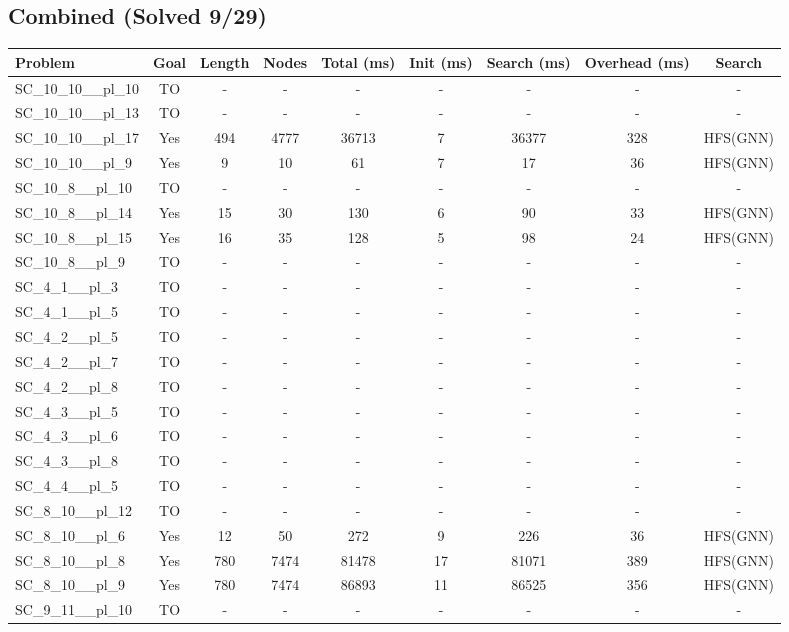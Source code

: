 \documentclass{article}
\begin{document}
\subsection*{Combined (Solved 9/29)}
\begin{tabular}{lcccccccc}
\toprule
Problem & Goal & Length & Nodes & Total (ms) & Init (ms) & Search (ms) & Overhead (ms) & Search \\
\midrule
SC\_10\_10\_\_pl\_10 & TO & - & - & - & - & - & - & - \\
SC\_10\_10\_\_pl\_13 & TO & - & - & - & - & - & - & - \\
SC\_10\_10\_\_pl\_17 & Yes & 494 & 4777 & 36713 & 7 & 36377 & 328 & HFS(GNN) \\
SC\_10\_10\_\_pl\_9 & Yes & 9 & 10 & 61 & 7 & 17 & 36 & HFS(GNN) \\
SC\_10\_8\_\_pl\_10 & TO & - & - & - & - & - & - & - \\
SC\_10\_8\_\_pl\_14 & Yes & 15 & 30 & 130 & 6 & 90 & 33 & HFS(GNN) \\
SC\_10\_8\_\_pl\_15 & Yes & 16 & 35 & 128 & 5 & 98 & 24 & HFS(GNN) \\
SC\_10\_8\_\_pl\_9 & TO & - & - & - & - & - & - & - \\
SC\_4\_1\_\_pl\_3 & TO & - & - & - & - & - & - & - \\
SC\_4\_1\_\_pl\_5 & TO & - & - & - & - & - & - & - \\
SC\_4\_2\_\_pl\_5 & TO & - & - & - & - & - & - & - \\
SC\_4\_2\_\_pl\_7 & TO & - & - & - & - & - & - & - \\
SC\_4\_2\_\_pl\_8 & TO & - & - & - & - & - & - & - \\
SC\_4\_3\_\_pl\_5 & TO & - & - & - & - & - & - & - \\
SC\_4\_3\_\_pl\_6 & TO & - & - & - & - & - & - & - \\
SC\_4\_3\_\_pl\_8 & TO & - & - & - & - & - & - & - \\
SC\_4\_4\_\_pl\_5 & TO & - & - & - & - & - & - & - \\
SC\_8\_10\_\_pl\_12 & TO & - & - & - & - & - & - & - \\
SC\_8\_10\_\_pl\_6 & Yes & 12 & 50 & 272 & 9 & 226 & 36 & HFS(GNN) \\
SC\_8\_10\_\_pl\_8 & Yes & 780 & 7474 & 81478 & 17 & 81071 & 389 & HFS(GNN) \\
SC\_8\_10\_\_pl\_9 & Yes & 780 & 7474 & 86893 & 11 & 86525 & 356 & HFS(GNN) \\
SC\_9\_11\_\_pl\_10 & TO & - & - & - & - & - & - & - \\

\end{tabular}
\end{document}
